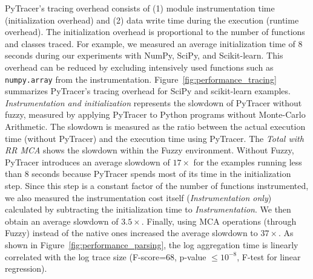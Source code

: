 \documentclass[10pt,journal,compsoc]{IEEEtran}
\newcommand{\pytracer}[0]{PyTracer\xspace}
\begin{document}
\pytracer's tracing overhead consists of (1) module instrumentation time
(initialization overhead) and (2) data write time during the execution (runtime
overhead). The initialization overhead is proportional to the number of
functions and classes traced. For example, we measured an average initialization
time of 8 seconds during our experiments with  NumPy, SciPy, and Scikit-learn.
This overhead can be reduced by excluding intensively used functions such as
\texttt{numpy.array} from the instrumentation.
Figure~\ref{fig:performance_tracing} summarizes \pytracer's tracing overhead for
SciPy and scikit-learn examples. \textit{Instrumentation and initialization}
represents the slowdown of \pytracer without fuzzy, measured by applying
PyTracer to Python programs without Monte-Carlo Arithmetic. The slowdown is
measured as the ratio between the actual execution time (without \pytracer) and
the execution time using \pytracer. The \textit{Total with RR MCA} shows the
slowdown within the Fuzzy environment. Without Fuzzy, \pytracer introduces an
average slowdown of $17\times$ for the examples running less than 8 seconds
because \pytracer spends most of its time in the initialization step. Since this
step is a constant factor of the number of functions instrumented, we also
measured the instrumentation cost itself (\textit{Instrumentation only})
calculated by subtracting the initialization time to \textit{Instrumentation}.
We then obtain an average slowdown of $3.5\times$. Finally, using MCA operations
(through Fuzzy) instead of the native ones increased the average slowdown to
$37\times$. As shown in Figure~\ref{fig:performance_parsing}, the log
aggregation time is linearly correlated with the log trace size (F-score=68,
p-value $\leq 10^{-8}$, F-test for linear regression).
\end{document}
